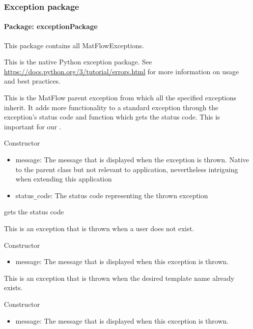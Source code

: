 \subsubsection{Exception package}

\paragraph{Package: exceptionPackage}This package contains all MatFlowExceptions.

This is the native Python exception package. See \url{https://docs.python.org/3/tutorial/errors.html} 
for more information on usage and best practices.

This is the MatFlow parent exception from which all the specified exceptions inherit. It adds more functionality to 
a standard exception through the exception's status code and function which gets the status code. This is important for our
.
\begin{methodenv}{Constructor}
\begin{itemize}
	\item{message:}
	The message that is displayed when the exception is thrown. Native to the parent class but not relevant to application,
    nevertheless intriguing when extending this application 
    \item{status\texttt{\_}code:}
	The status code representing the thrown exception
\end{itemize}

gets the status code

\end{methodenv}


This is an exception that is thrown when a user does not exist.
\begin{methodenv}{Constructor}

\begin{itemize}
    \item{message:}
    The message that is displayed when this exception is thrown.
\end{itemize}

\end{methodenv}

This is an exception that is thrown when the desired template name already exists.
\begin{methodenv}{Constructor}

\begin{itemize}
    \item{message:}
    The message that is displayed when this exception is thrown.
\end{itemize}
\end{methodenv}


